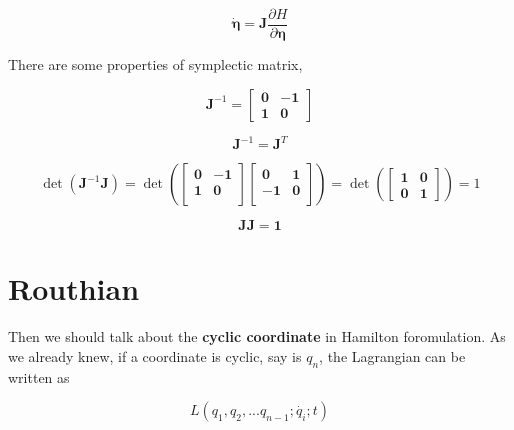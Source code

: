 \documentclass[12pt]{article}
\numberwithin{equation}{section}
\begin{document}
\begin{center}
    \[ \dot{\pmb{\eta}} = \pmb{J}\frac{\partial H}{\partial \pmb{\eta}} \]
\end{center}

There are some properties of symplectic matrix,

\begin{center}
    \[ \pmb{J}^{-1} = \begin{bmatrix}
        \pmb{0}&\pmb{-1}\\
        \pmb{1}&\pmb{0}
    \end{bmatrix}
    \]
\end{center}

\begin{center}
    \[ \pmb{J}^{-1} = \pmb{J}^T\]
\end{center}

\begin{center}
    \[ \det\left(\pmb{J}^{-1}\pmb{J}\right) = 
    \det\left(\begin{bmatrix}
        \pmb{0}&\pmb{-1}\\
        \pmb{1}&\pmb{0}\\
    \end{bmatrix}
    \begin{bmatrix}
        \pmb{0}&\pmb{1}\\
        \pmb{-1}&\pmb{0}\\
    \end{bmatrix}\right)
    = \det\left(\begin{bmatrix}
        \pmb{1}&\pmb{0}\\
        \pmb{0}&\pmb{1}
    \end{bmatrix}\right)
    = 1
    \]
\end{center}

\begin{center}
    \[ \pmb{JJ} = \pmb{1} \]
\end{center}

\section{Routhian}

Then we should talk about the \textbf{cyclic coordinate} in Hamilton foromulation. As we already knew, if a coordinate is cyclic, say is $q_n$, the Lagrangian can be written as 

\begin{center}
    \[ L(q_1, q_2, ... q_{n-1}; \dot{q_i}; t) \]
\end{center}
\end{document}
